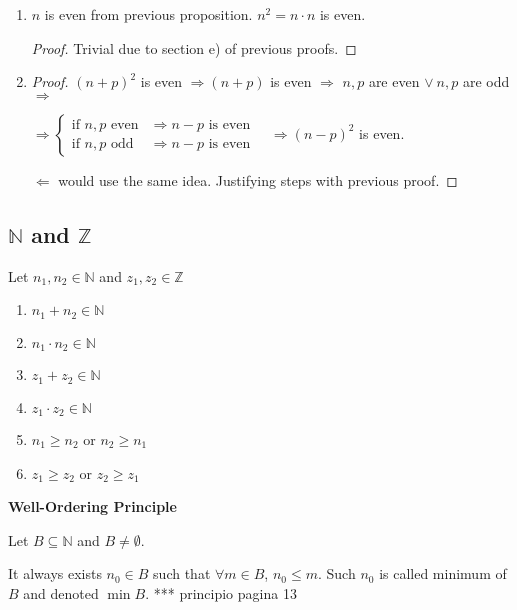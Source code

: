 \documentclass[12pt, a4paper]{book}
\begin{document}
\begin{proposition}
  \begin{enumerate}[label=\emph{\alph*})]
    \item $n$ is even from previous proposition. $n^2 = n \cdot n$ is even.
    \begin{proof}
      Trivial due to section e) of previous proofs.
    \end{proof}
    \item \begin{proof}
      ${(n+p)}^2$ is even $\Rightarrow (n+p)$ is even $\Rightarrow$ $n,p$ are even $\vee\ n,p$ are odd $\Rightarrow$  
    
      $\Rightarrow \displaystyle
      \begin{cases} 
        \text{if } n,p \text{ even} &\Rightarrow n-p \text{ is even} \\
        \text{if } n,p \text{ odd} &\Rightarrow n-p \text{ is even}
      \end{cases}\quad \Rightarrow {(n-p)}^2$ is even.

      $\Leftarrow$ would use the same idea. Justifying steps with previous proof.
    \end{proof}
  \end{enumerate}
\end{proposition}

\subsection{$\mathbb{N}$ and $\mathbb{Z}$}

\begin{prop}
  Let $n_1, n_2 \in \mathbb{N}$ and $z_1, z_2 \in \mathbb{Z}$
  \begin{enumerate}[label=\emph{\alph*})]
    \item $n_1 + n_2 \in \mathbb{N}$
    \item $n_1 \cdot n_2 \in \mathbb{N}$
    \item $z_1 + z_2 \in \mathbb{N}$
    \item $z_1 \cdot z_2 \in \mathbb{N}$
    \item $n_1 \geq n_2$ or $n_2 \geq n_1$
    \item $z_1 \geq z_2$ or $z_2 \geq z_1$
  \end{enumerate}
\end{prop}

\begin{prop}
  \textbf{Well-Ordering Principle}

  Let $B \subseteq \mathbb{N}$ and $B \neq \emptyset$.

  It always exists $n_0 \in B$ such that $\forall m\in B$, $n_0 \leq m$. Such $n_0$ is called minimum of $B$ and denoted $\min B$.
  *** principio pagina 13
\end{prop}
\end{document}
